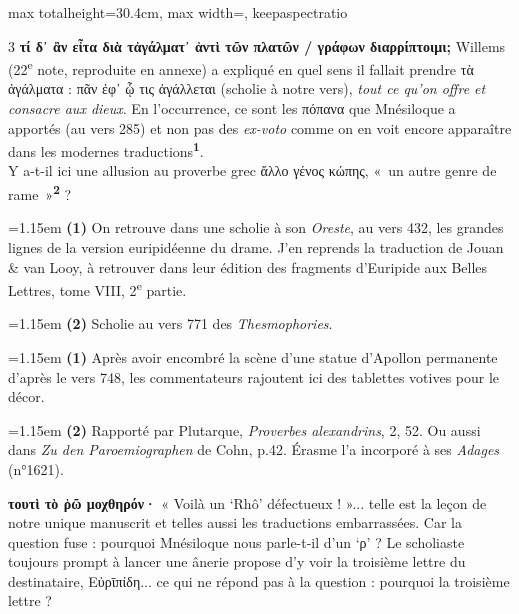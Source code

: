 \documentclass[11pt,twoside]{book}
\newcommand{\italique}[1]{\textit{#1}}
\newcommand{\nieme}[1]{#1\textsuperscript{e}}
\newcommand{\grec}[1]{{\policeGr #1}}
\newcommand{\marqueur}[1]{\textsuperscript{\color{rubricRed}\textbf{#1}}}
\begin{document}
\begin{adjustbox}{max totalheight=30.4cm, max width=\textwidth, keepaspectratio}
\begin{minipage}{\textwidth}
{\begin{multicols}{3}
 \textbf{τί δ᾽ ἂν εἶτα διὰ τἀγάλματ᾽ ἀντὶ τῶν πλατῶν / γράφων διαρρίπτοιμι;} Willems (\nieme{22} note, reproduite en annexe) a expliqué en quel sens il fallait prendre \grec{τὰ ἀγάλματα} : \grec{πᾶν ἐφ᾽ ᾧ τις ἀγάλλεται} (scholie à notre vers), \italique{tout ce qu'on offre et consacre aux dieux}. En l'occurrence, ce sont les \grec{πόπανα} que Mnésiloque a apportés (au vers 285) et non pas des \italique{ex-voto} comme on en voit encore apparaître dans les modernes traductions\marqueur{1}.\\ Y a-t-il ici une allusion au proverbe grec ἄλλο γένος κώπης, «~un autre genre de rame~»\marqueur{2} ?
\par\vspace{1.5pt}
\par\vspace{1.2pt}\par\nopagebreak\vspace{1pt}\noindent\hangindent=1.15em {\color{sepiaNote}\textbf{(1)}} On retrouve dans une scholie à son \italique{Oreste}, au vers 432, les grandes lignes de la version euripidéenne du drame. J'en reprends la traduction de Jouan \& van Looy, à retrouver dans leur édition des fragments d'Euripide aux Belles Lettres, tome VIII, \nieme{2} partie.
\par\vspace{1.5pt}
\noindent\hangindent=1.15em {\color{sepiaNote}\textbf{(2)}} Scholie au vers 771 des \italique{Thesmophories}.
\par\vspace{1.5pt}
\noindent\hangindent=1.15em {\color{sepiaNote}\textbf{(1)}} Après avoir encombré la scène d'une statue d'Apollon permanente d'après le vers 748, les commentateurs rajoutent ici des tablettes votives pour le décor.
\par\vspace{1.5pt}
\noindent\hangindent=1.15em {\color{sepiaNote}\textbf{(2)}} Rapporté par Plutarque, \italique{Proverbes alexandrins}, 2, 52. Ou aussi dans \italique{Zu den Paroemiographen} de Cohn, p.42. Érasme l'a incorporé à ses \italique{Adages} (n°1621).
\par\vspace{1.5pt}
 \textbf{τουτὶ τὸ ῥῶ μοχθηρόν·} « Voilà un `Rhô' défectueux ! »... telle est la leçon de notre unique manuscrit et telles aussi les traductions embarrassées. Car la question fuse : pourquoi Mnésiloque nous parle-t-il d'un `ρ' ? Le scholiaste toujours prompt à lancer une ânerie propose d'y voir la troisième lettre du destinataire, Εὐρῑπίδη... ce qui ne répond pas à la question : pourquoi la troisième lettre ?

\end{multicols}}
\end{minipage}
\end{adjustbox}
\end{document}
